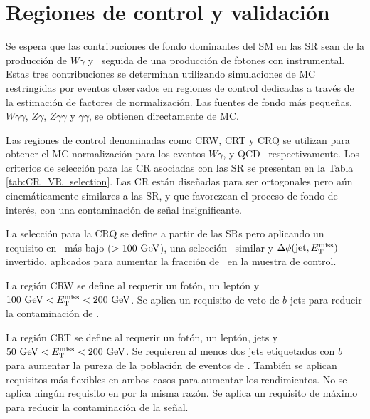 \section{Regiones de control y validación}

Se espera que las contribuciones de fondo dominantes del SM en las SR sean de la
producción de $W \gamma$ y \ttbarph\, seguida de una producción de fotones con \met instrumental. Estas tres contribuciones se determinan utilizando simulaciones de MC restringidas por eventos observados en regiones de control dedicadas a través de la estimación de factores de normalización. Las fuentes de fondo más pequeñas,
$ W \gamma \gamma $, $ Z \gamma $, $ Z \gamma \gamma $ y $ \gamma \gamma $, se obtienen
directamente de MC.

Las regiones de control denominadas como CRW, CRT y CRQ se utilizan para obtener el MC
normalización para los eventos $ W \gamma $, \ttbarph y QCD \phj\, respectivamente.
Los criterios de selección para las CR asociadas con las SR se presentan en la Tabla \ref{tab:CR_VR_selection}. Las CR están diseñadas para ser ortogonales pero aún cinemáticamente similares a las SR, y que favorezcan el proceso de fondo de interés, con una contaminación de señal insignificante.

La selección para la CRQ se define a partir de las SRs pero
aplicando un requisito en \met\ más bajo ($> 100\ \gev $), una selección \HT\ similar
y $ \Delta\phi(\text{jet}, E_{\text{T}}^{\text{miss}})$ invertido, aplicados para aumentar la fracción de
\phj\ en la muestra de control.

La región CRW se define al requerir un fotón, un leptón y $ 100\ \text{GeV} <E_{\text{T}}^{\text{miss}} <200 \ \text{GeV} $. Se aplica un requisito de veto de $b$-jets para reducir la contaminación de \ttbarph.

La región CRT se define al requerir un fotón, un leptón, jets y $ 50 \ \text{GeV} <E_{\text{T}}^{\text{miss}} <200 \ \text{GeV} $. Se requieren al menos dos jets etiquetados con $b$ para aumentar la pureza de la población de eventos de \ttbarph. También se aplican requisitos más flexibles en ambos casos para aumentar los rendimientos. No se aplica ningún requisito en \rtf por la misma razón. Se aplica un requisito de \met máximo para reducir la contaminación de la señal.

